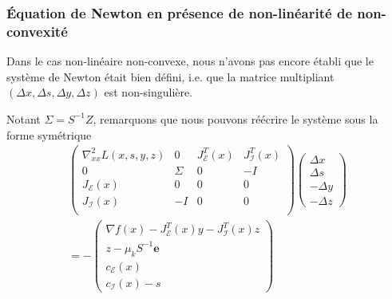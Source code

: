 \documentclass[usepdftitle=false,aspectratio=169]{beamer}
\def\cE{\mathcal{E}}
\def\cI{\mathcal{I}}
\def\be{\boldsymbol{e}}
\begin{document}
\begin{frame}
\frametitle{Équation de Newton en présence de non-linéarité de non-convexité}

Dans le cas non-linéaire non-convexe, nous n'avons pas encore établi que le système de Newton était bien défini, i.e. que la matrice multipliant $(\Delta x, \Delta s, \Delta y, \Delta z)$ est non-singulière.

Notant $\Sigma = S^{-1}Z$, remarquons que nous pouvons réécrire le système sous la forme symétrique
\begin{multline*}
\begin{pmatrix}
\nabla^2_{xx} L(x,s,y,z) & 0 &  J^T_{\cE}(x) &  J^T_{\cI}(x) \\
0 & \Sigma & 0 & -I \\
J_{\cE}(x) & 0 & 0 & 0 \\
J_{\cI}(x) & -I & 0 & 0 \\
\end{pmatrix}
\begin{pmatrix}
\Delta x \\
\Delta s \\
-\Delta y \\
-\Delta z	
\end{pmatrix}
\\
= -\begin{pmatrix}
\nabla f(x) - J^T_{\cE}(x) y - J^T_{\cI} (x) z \\
z - \mu_k S^{-1} \be \\
c_{\cE}(x) \\
c_{\cI}(x)-s
\end{pmatrix}
\end{multline*}

\end{frame}
\end{document}
